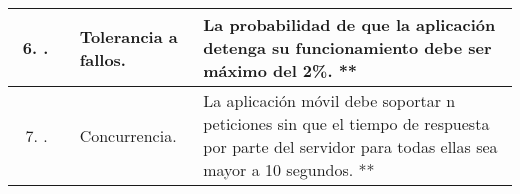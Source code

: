 \begin{longtable}{|M{1.6cm}|M{4.0cm}|M{6.0cm}|}
\begin{enumerate}[label=RNF\arabic*]
        \setcounter{enumi}{5}
 	    \item.
 	\end{enumerate}
 	& Tolerancia a fallos.
 	& La probabilidad de que la aplicación detenga su funcionamiento debe ser máximo del 2\%. ** \\
    \hline
    \begin{enumerate}[label=RNF\arabic*]
        \setcounter{enumi}{6}
 	    \item.
 	\end{enumerate}
 	& Concurrencia.
 	& La aplicación móvil debe soportar n peticiones sin que el tiempo de respuesta por parte del servidor para todas ellas sea mayor a 10 segundos. ** \\
    \hline
\end{longtable}
